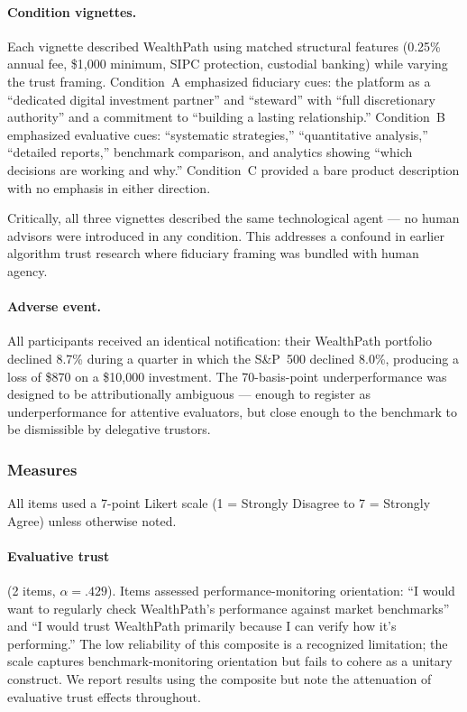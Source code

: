 \paragraph{Condition vignettes.} Each vignette described WealthPath using matched structural features (0.25\% annual fee, \$1,000 minimum, SIPC protection, custodial banking) while varying the trust framing. Condition~A emphasized fiduciary cues: the platform as a ``dedicated digital investment partner'' and ``steward'' with ``full discretionary authority'' and a commitment to ``building a lasting relationship.'' Condition~B emphasized evaluative cues: ``systematic strategies,'' ``quantitative analysis,'' ``detailed reports,'' benchmark comparison, and analytics showing ``which decisions are working and why.'' Condition~C provided a bare product description with no emphasis in either direction.

Critically, all three vignettes described the same technological agent --- no human advisors were introduced in any condition. This addresses a confound in earlier algorithm trust research where fiduciary framing was bundled with human agency.

\paragraph{Adverse event.} All participants received an identical notification: their WealthPath portfolio declined 8.7\% during a quarter in which the S\&P~500 declined 8.0\%, producing a loss of \$870 on a \$10,000 investment. The 70-basis-point underperformance was designed to be attributionally ambiguous --- enough to register as underperformance for attentive evaluators, but close enough to the benchmark to be dismissible by delegative trustors.

\subsubsection{Measures}
\label{sec:methods_measures}

All items used a 7-point Likert scale (1 = Strongly Disagree to 7 = Strongly Agree) unless otherwise noted.

\paragraph{Evaluative trust} (2 items, $\alpha = .429$). Items assessed performance-monitoring orientation: ``I would want to regularly check WealthPath's performance against market benchmarks'' and ``I would trust WealthPath primarily because I can verify how it's performing.'' The low reliability of this composite is a recognized limitation; the scale captures benchmark-monitoring orientation but fails to cohere as a unitary construct. We report results using the composite but note the attenuation of evaluative trust effects throughout.

